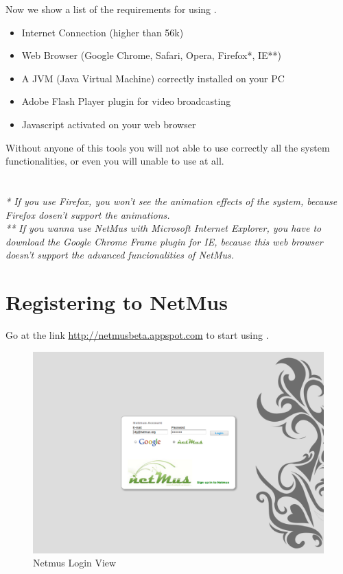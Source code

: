 Now we show a list of the requirements for using .

\begin{itemize}
  \item Internet Connection (higher than 56k)
  \item Web Browser (Google Chrome, Safari, Opera, Firefox*, IE**)
  \item A JVM (Java Virtual Machine) correctly installed on your PC
  \item Adobe Flash Player plugin for video broadcasting
  \item Javascript activated on your web browser
\end{itemize}

Without anyone of this tools you will not able to use
correctly all the system functionalities, or even you will unable to use
 at all.\\
\\
\\

\emph{* If you use Firefox, you won't see the animation effects of the
system, because Firefox dosen't support the animations.}\\ 
\emph{** If you wanna use NetMus with Microsoft Internet Explorer, you have to
download the Google Chrome Frame plugin for IE, because this web browser doesn't
support the advanced funcionalities of NetMus.}\\

\section{Registering to NetMus}

Go at the link \url{http://netmusbeta.appspot.com} to start using .\\

\begin{figure}[htbp]
  \centering
  \includegraphics[width=15cm]{img/MU/login.png}
\caption{Netmus Login View}
\end{figure}


